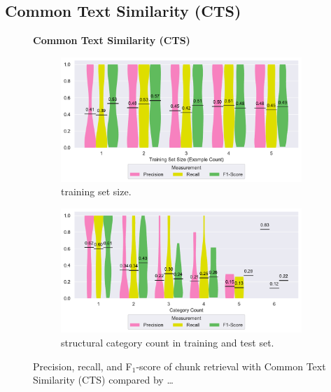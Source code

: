 \subsection{Common Text Similarity (CTS)}
\label{sec:r:cts}

\begin{figure}
\centering
    \textbf{Common Text Similarity (CTS)}\par\medskip
\begin{subfigure}[tb]{\columnwidth}
		\centering
		\includegraphics[width=\columnwidth,
		clip]{img/big-study/recall-precision-examplecount-CTS.pdf}
		\caption{training set size.}
		\label{fig:recall-precision-examplecount-CTS}

\end{subfigure}\hspace{\fill}
\begin{subfigure}[tb]{\columnwidth}
		\centering
				\includegraphics[width=\columnwidth,
				clip]{img/big-study/recall-precision-categorycount-CTS.pdf}
		\caption{structural category count
		in training and test set.}
		\label{fig:recall-precision-categorycount-CTS}
\end{subfigure}
\caption{Precision, recall, and F$_{1}$-score of chunk
retrieval with Common Text Similarity (CTS) compared by \ldots}
\label{fig:results-CTS}
\end{figure}

